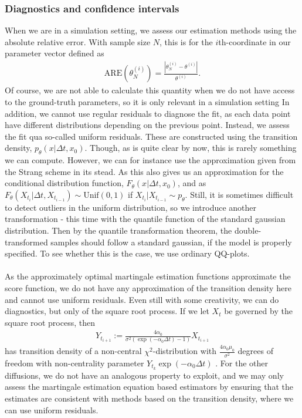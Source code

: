 \subsubsection{Diagnostics and confidence intervals}
When we are in a simulation setting, we assess our estimation methods using the absolute relative error. With sample size $N$, this is for the $i$th-coordinate in our parameter vector defined as
\begin{align}
    \mathrm{ARE}\left(\theta_N^{(i)}\right) = \frac{\left|\theta_N^{(i)} - \theta^{(i)}\right|}{\theta^{(i)}}. \label{eq:ARE}
\end{align}
Of course, we are not able to calculate this quantity when we do not have access to the ground-truth parameters, so it is only relevant in a simulation setting In addition, we cannot use regular residuals to diagnose the fit, as each data point have different distributions depending on the previous point. Instead, we assess the fit qua so-called uniform residuals. These are constructed using the transition density, $p_\theta(x|\Delta t, x_0)$. Though, as is quite clear by now, this is rarely something we can compute. However, we can for instance use the approximation given from the Strang scheme in its stead. As this also gives us an approximation for the conditional distribution function, $F_\theta(x|\Delta t, x_0)$, and as $F_\theta(X_{t_{i}}|\Delta t, X_{t_{i - 1}})\sim \mathrm{Unif}(0,1)$ if $X_{t_{i}}|X_{t_{i - 1}} \sim p_\theta$. Still, it is sometimes difficult to detect outliers in the uniform distribution, so we introduce another transformation - this time with the quantile function of the standard gaussian distribution. Then by the quantile transformation theorem, the double-transformed samples should follow a standard gaussian, if the model is properly specified. To see whether this is the case, we use ordinary QQ-plots.\\\\
As the approximately optimal martingale estimation functions approximate the score function, we do not have any approximation of the transition density here and cannot use uniform residuals. Even still with some creativity, we can do diagnostics, but only of the square root process. If we let $X_t$ be governed by the square root process, then
\begin{align}
    Y_{t_{i + 1}} := \frac{4\alpha_0}{\sigma^2\left(\exp\left(-\alpha_0 \Delta t\right) - 1\right)}X_{t_{i + 1}}
\end{align}
has transition density of a non-central $\chi^2$-distribution with $\frac{4\alpha_0\mu_0}{\sigma^2}$ degrees of freedom with non-centrality parameter $Y_{t_k}\exp\left(-\alpha_0 \Delta t\right)$ \cite[Equation (5.68)]{Srkk2019}. For the other diffusions, we do not have an analogous property to exploit, and we may only assess the martingale estimation equation based estimators by ensuring that the estimates are consistent with methods based on the transition density, where we can use uniform residuals.\\\\
